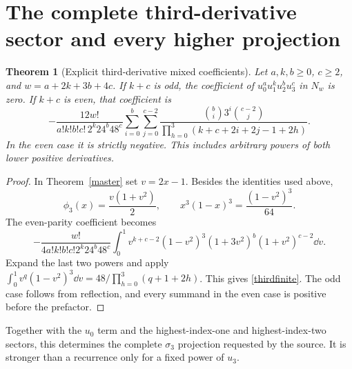 \documentclass[11pt]{article}
\numberwithin{equation}{section}
\newtheorem{theorem}{Theorem}[section]
\theoremstyle{definition}\newtheorem{definition}[theorem]{Definition}
\theoremstyle{remark}\newtheorem{remark}[theorem]{Remark}
\begin{document}
\section{The complete third-derivative sector and every higher projection}
\begin{theorem}[Explicit third-derivative mixed coefficients]\label{third}
Let $a,k,b\ge0$, $c\ge2$, and $w=a+2k+3b+4c$. If $k+c$ is odd, the coefficient of $u_0^au_1^ku_2^bu_3^c$ in $N_w$ is zero. If $k+c$ is even, that coefficient is
\begin{equation}\label{thirdfinite}
\boxed{
 -\frac{12w!}{a!k!b!c!\,2^k24^b48^c}
 \sum_{i=0}^b\sum_{j=0}^{c-2}
 \frac{\binom bi3^i\binom{c-2}{j}}
 {\displaystyle\prod_{h=0}^3(k+c+2i+2j-1+2h)} .}
\end{equation}
In the even case it is strictly negative. This includes arbitrary powers of both lower positive derivatives.
\end{theorem}
\begin{proof}
In Theorem~\ref{master} set $v=2x-1$. Besides the identities used above,
\[
 \phi_3(x)=\frac{v(1+v^2)}2,
 \qquad x^3(1-x)^3=\frac{(1-v^2)^3}{64}.
\]
The even-parity coefficient becomes
\[
 -\frac{w!}{4a!k!b!c!2^k24^b48^c}
 \int_0^1v^{k+c-2}(1-v^2)^3(1+3v^2)^b(1+v^2)^{c-2}\dd v.
\]
Expand the last two powers and apply
$\int_0^1v^q(1-v^2)^3\dd v=48/\prod_{h=0}^3(q+1+2h)$.
This gives \eqref{thirdfinite}. The odd case follows from reflection, and every summand in the even case is positive before the prefactor.
\end{proof}
Together with the $u_0$ term and the highest-index-one and highest-index-two sectors, this determines the complete $\sigma_3$ projection requested by the source. It is stronger than a recurrence only for a fixed power of $u_3$.
\end{document}
